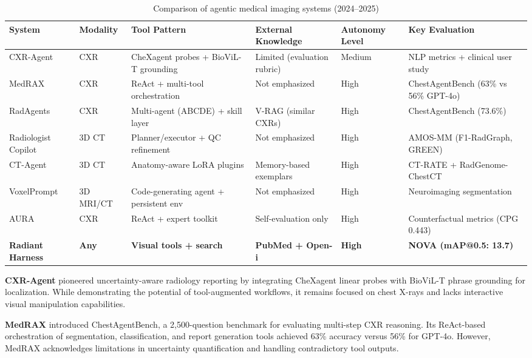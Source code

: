 \documentclass[11pt]{article}
\begin{document}
\begin{table}[t]
\centering
\caption{Comparison of agentic medical imaging systems (2024--2025)}
\label{tab:competitors}
\small
\begin{tabular}{@{}p{2.2cm}p{1.8cm}p{3.5cm}p{2.5cm}p{2cm}p{3cm}@{}}
\toprule
\textbf{System} & \textbf{Modality} & \textbf{Tool Pattern} & \textbf{External Knowledge} & \textbf{Autonomy Level} & \textbf{Key Evaluation} \\
\midrule
CXR-Agent \citep{sharma2024cxragent} & CXR & CheXagent probes + BioViL-T grounding & Limited (evaluation rubric) & Medium & NLP metrics + clinical user study \\
MedRAX \citep{medrax2025} & CXR & ReAct + multi-tool orchestration & Not emphasized & High & ChestAgentBench (63\% vs 56\% GPT-4o) \\
RadAgents \citep{radagents2025} & CXR & Multi-agent (ABCDE) + skill layer & V-RAG (similar CXRs) & High & ChestAgentBench (73.6\%) \\
Radiologist Copilot \citep{yucopilot2025} & 3D CT & Planner/executor + QC refinement & Not emphasized & High & AMOS-MM (F1-RadGraph, GREEN) \\
CT-Agent \citep{mao2025ctagent} & 3D CT & Anatomy-aware LoRA plugins & Memory-based exemplars & High & CT-RATE + RadGenome-ChestCT \\
VoxelPrompt \citep{hoopes2024voxelprompt} & 3D MRI/CT & Code-generating agent + persistent env & Not emphasized & High & Neuroimaging segmentation \\
AURA \citep{fathi2025aura} & CXR & ReAct + expert toolkit & Self-evaluation only & High & Counterfactual metrics (CPG 0.443) \\
\textbf{Radiant Harness} & \textbf{Any} & \textbf{Visual tools + search} & \textbf{PubMed + Open-i} & \textbf{High} & \textbf{NOVA (mAP@0.5: 13.7)} \\
\bottomrule
\end{tabular}
\end{table}

\textbf{CXR-Agent} \citep{sharma2024cxragent} pioneered uncertainty-aware radiology reporting by integrating CheXagent linear probes with BioViL-T phrase grounding for localization. While demonstrating the potential of tool-augmented workflows, it remains focused on chest X-rays and lacks interactive visual manipulation capabilities.

\textbf{MedRAX} \citep{medrax2025} introduced ChestAgentBench, a 2,500-question benchmark for evaluating multi-step CXR reasoning. Its ReAct-based orchestration of segmentation, classification, and report generation tools achieved 63\% accuracy versus 56\% for GPT-4o. However, MedRAX acknowledges limitations in uncertainty quantification and handling contradictory tool outputs.
\end{document}
